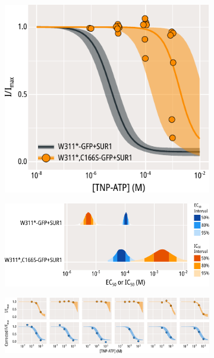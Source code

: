 \begin{figure}[hbtp]
\begin{subfigure}[t]{0.3\textwidth}
		\includegraphics[width=\textwidth]{c166s_7.pdf}
	\end{subfigure}
	\hfill
	\begin{subfigure}[t]{0.6\textwidth}
		\caption{}\label{ch5fig:c166s_params_2}
		\centering
		\includegraphics[width=\textwidth]{c166s_8.pdf}
	\end{subfigure}
	\vfill
	\begin{subfigure}[t]{0.9\textwidth}
		\caption{}\label{ch5fig:c166s_indfits_2}
		\centering
		\includegraphics[width=\textwidth]{c166s_9.pdf}
	\end{subfigure}

\end{figure}
